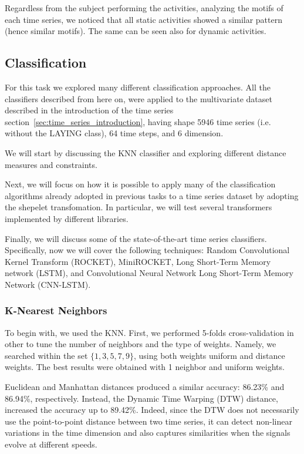 \documentclass[10pt, a4paper, twocolumn]{article}
\begin{document}
Regardless from the subject performing the activities, analyzing the motifs of each time series, we noticed that all static activities showed a similar pattern (hence similar motifs). The same can be seen also for dynamic activities.  

\subsection{Classification}

For this task we explored many different classification approaches. All the classifiers described from here on, were applied to the multivariate dataset described in the introduction of the time series section~\ref{sec:time_series_introduction}, having shape 5946 time series (i.e. without the LAYING class), 64 time steps, and 6 dimension. 

We will start by discussing the KNN classifier and exploring different distance measures and constraints. 

Next, we will focus on how it is possible to apply many of the classification algorithms already adopted in previous tasks to a time series dataset by adopting the shepelet transfomation. In particular, we will test several transformers implemented by different libraries. 

Finally, we will discuss some of the state-of-the-art time series classifiers. Specifically, now we will cover the following techniques: Random Convolutional Kernel Transform (ROCKET), MiniROCKET, Long Short-Term Memory network (LSTM), and Convolutional Neural Network Long Short-Term Memory Network (CNN-LSTM).

\subsubsection*{K-Nearest Neighbors}

To begin with, we used the KNN. First, we performed 5-folds cross-validation in other to tune the number of neighbors and the type of weights. Namely, we searched within the set $\{1,3,5,7,9\}$, using both  weights uniform and distance weights. The best results were obtained with 1 neighbor and uniform weights.

Euclidean and Manhattan distances produced a similar accuracy:  86.23\% and 86.94\%, respectively.  Instead, the Dynamic Time Warping (DTW) distance, increased the accuracy up to 89.42\%. Indeed, since the DTW does not necessarily use the point-to-point distance between two time series, it can detect non-linear variations in the time dimension and also captures similarities when the signals evolve at different speeds. 
\end{document}
